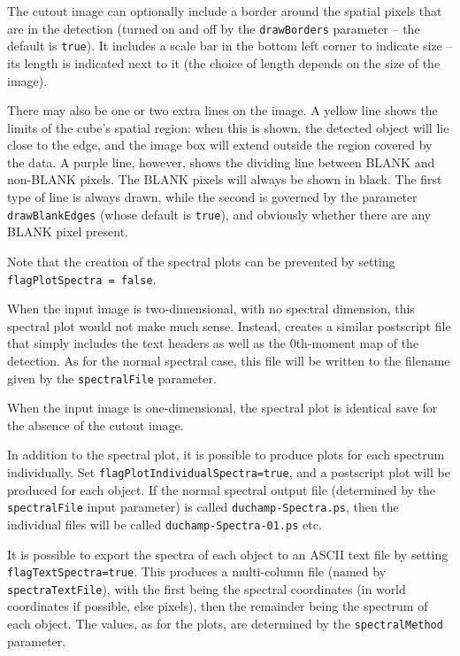 The cutout image can optionally include a border around the spatial
pixels that are in the detection (turned on and off by the
\texttt{drawBorders} parameter -- the default is \texttt{true}). It
includes a scale bar in the bottom left corner to indicate size -- its
length is indicated next to it (the choice of length depends on the
size of the image).

There may also be one or two extra lines on the image. A yellow line
shows the limits of the cube's spatial region: when this is shown, the
detected object will lie close to the edge, and the image box will
extend outside the region covered by the data. A purple line, however,
shows the dividing line between BLANK and non-BLANK pixels. The BLANK
pixels will always be shown in black. The first type of line is always
drawn, while the second is governed by the parameter
\texttt{drawBlankEdges} (whose default is \texttt{true}), and
obviously whether there are any BLANK pixel present.

Note that the creation of the spectral plots can be prevented by
setting \texttt{flagPlotSpectra = false}.

When the input image is two-dimensional, with no spectral dimension,
this spectral plot would not make much sense. Instead, \duchamp
creates a similar postscript file that simply includes the text
headers as well as the 0th-moment map of the detection. As for the
normal spectral case, this file will be written to the filename given
by the \texttt{spectralFile} parameter.

When the input image is one-dimensional, the spectral plot is
identical save for the absence of the cutout image.

In addition to the spectral plot, it is possible to produce plots for
each spectrum individually. Set
\texttt{flagPlotIndividualSpectra=true}, and a postscript plot will be
produced for each object. If the normal spectral output file
(determined by the \texttt{spectralFile} input parameter) is called
\texttt{duchamp-Spectra.ps}, then the individual files will be called
\texttt{duchamp-Spectra-01.ps} etc. 


It is possible to export the spectra of each object to an ASCII text
file by setting \texttt{flagTextSpectra=true}. This produces a
multi-column file (named by \texttt{spectraTextFile}), with the first
being the spectral coordinates (in world coordinates if possible, else
pixels), then the remainder being the spectrum of each object. The
values, as for the plots, are determined by the
\texttt{spectralMethod} parameter. 

